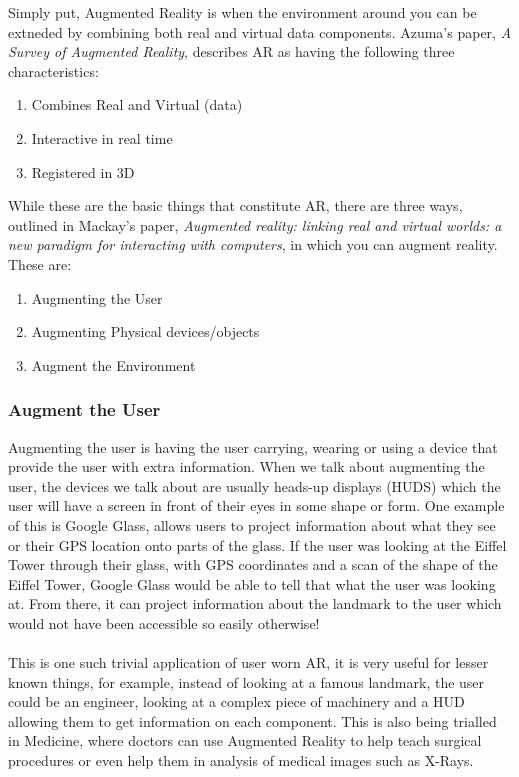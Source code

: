 \documentclass[11pt]{article}
\begin{document}
Simply put, Augmented Reality is when the environment around you can be 
extneded by combining both real and virtual data components. Azuma's 
paper\cite{Azuma97}, \textit{A Survey of Augmented Reality},
describes AR as having the following three characteristics:
\begin{enumerate}
	\item Combines Real and Virtual (data) 
	\item Interactive in real time
	\item Registered in 3D
\end{enumerate}

While these are the basic things that constitute AR, there are three ways, 
outlined in Mackay's paper\cite{Mackay}, \textit{Augmented reality: linking 
real and virtual worlds: a new paradigm for interacting with computers},
in which you can augment reality.\\
These are:
\begin{enumerate}
	\item Augmenting the User
	\item Augmenting Physical devices/objects
	\item Augment the Environment
\end{enumerate}

\subsubsection{Augment the User} 
Augmenting the user is having the user carrying, wearing or using a device
that provide the user with extra information. When we talk about augmenting
the user, the devices we talk about are usually
heads-up displays (HUDS) which the user will have a screen in front of their
eyes in some shape or form. One example of this is Google Glass, allows
users to project information about what they see or their GPS location onto
parts of the glass. If the user was looking at the Eiffel Tower through their 
glass, with GPS coordinates and a scan of the shape of the Eiffel Tower, 
Google Glass would be able to tell that what the user was looking at. From there,
it can project information about the landmark to the user which would not have
been accessible so easily otherwise! \\
\\
This is one such trivial application of
user worn AR, it is very useful for lesser known things, for example, instead of 
looking at a famous landmark, the user could be an engineer, looking at a 
complex piece of machinery and a HUD allowing them to get information on each
component. This is also being trialled in Medicine, where doctors can use
Augmented Reality to help teach surgical procedures or even help them in
analysis of medical images such as X-Rays.
\end{document}
